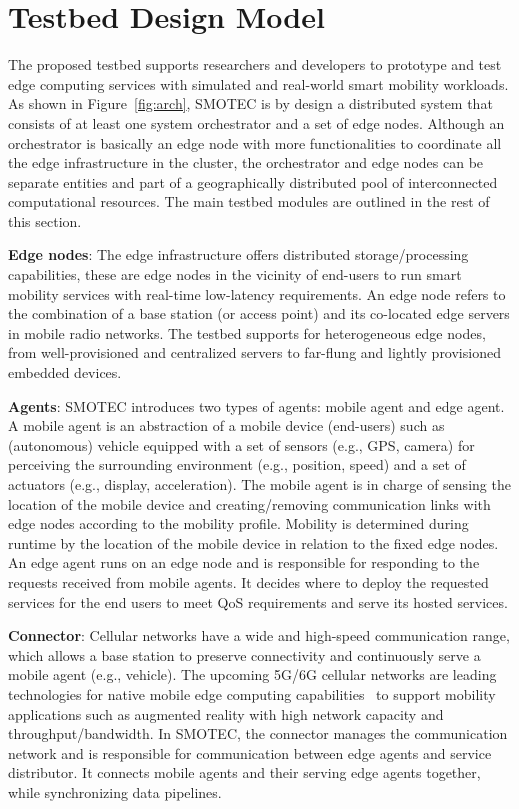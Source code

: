 \documentclass[conference]{IEEEtran}
\begin{document}
\section{Testbed Design Model}\label{sec:model}

The proposed testbed supports researchers and developers to prototype and test edge computing services with simulated and real-world smart mobility workloads. As shown in Figure~\ref{fig:arch}, SMOTEC is by design a distributed system that consists of at least one system orchestrator
and a set of edge nodes. Although an orchestrator is basically an edge node with more functionalities to coordinate all the edge infrastructure in the cluster, the orchestrator and edge nodes can be separate entities and part of a geographically distributed pool of
interconnected computational resources. The main testbed modules are outlined in the rest of this section.

\noindent \textbf{Edge nodes}: The edge infrastructure offers distributed storage/processing capabilities, these are edge nodes in the vicinity of end-users to run smart mobility services with real-time low-latency requirements. An edge node refers to the combination of a base station (or access point) and its co-located edge servers in mobile radio networks. The testbed supports for heterogeneous edge nodes, from well-provisioned and centralized servers to far-flung and lightly provisioned embedded devices.

\noindent \textbf{Agents}: SMOTEC introduces two types of agents: mobile agent and edge agent. A mobile agent is an abstraction of a mobile device (end-users) such as (autonomous) vehicle equipped with a set of sensors (e.g., GPS, camera) for perceiving the surrounding environment (e.g., position, speed) and a set of actuators (e.g., display, acceleration). The mobile agent is in charge of sensing the location of the mobile device and creating/removing communication links with edge nodes according to the mobility profile. Mobility is determined during runtime by the location of the mobile device in relation to the fixed edge nodes. 
An edge agent runs on an edge node and is responsible for responding to the requests received from mobile agents. It decides where to deploy the requested services for the end users to meet QoS requirements and serve its hosted services.

\noindent \textbf{Connector}: Cellular networks have a wide and high-speed communication range, which allows a base station to preserve connectivity and continuously serve a mobile agent (e.g., vehicle). The upcoming 5G/6G cellular networks are leading technologies for native mobile edge computing capabilities~\cite{slawomir2017next,narayanan2022collective} to support mobility applications such as augmented reality with high network capacity and throughput/bandwidth. In SMOTEC, the connector manages the communication network and is responsible for communication between edge agents and service distributor. It connects mobile agents and their serving edge agents together, while synchronizing data pipelines. 
\end{document}
